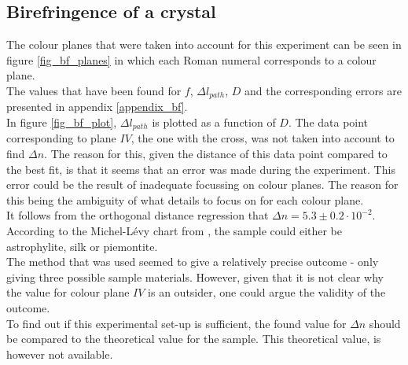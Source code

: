 \subsection{Birefringence of a crystal}
The colour planes that were taken into account for this experiment can be seen in figure \ref{fig_bf_planes} in which each Roman numeral corresponds to a colour plane. \\
The values that have been found for $f$, $\Delta l_{path}$, $D$ and the corresponding errors are presented in appendix \ref{appendix_bf}.\\
In figure \ref{fig_bf_plot}, $\Delta l_{path}$ is plotted as a function of $D$. The data point corresponding to plane $IV$, the one with the cross, was not taken into account to find $\Delta n$. The reason for this, given the distance of this data point compared to the best fit, is that it seems that an error was made during the experiment. This error could be the result of inadequate focussing on colour planes. The reason for this being the ambiguity of what details to focus on for each colour plane.\\
It follows from the orthogonal distance regression that $\Delta n = 5.3 \pm 0.2 \cdot 10^{-2}$. According to the Michel-L\'evy chart from \cite{bf_chart}, the sample could either be astrophylite, silk or piemontite.\\
The method that was used seemed to give a relatively precise outcome - only giving three possible sample materials. However, given that it is not clear why the value for colour plane $IV$ is an outsider, one could argue the validity of the outcome. \\
To find out if this experimental set-up is sufficient, the found value for $\Delta n$ should be compared to the theoretical value for the sample. This theoretical value, is however not available.

